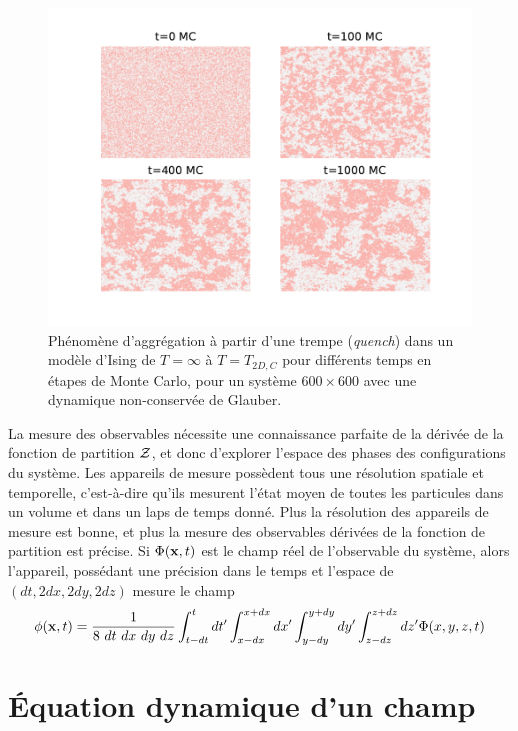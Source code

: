 \begin{figure}[t]
    \centering
    \includegraphics[width=0.9\linewidth]{intro/clusterization.pdf}
    \caption{Phénomène d'aggrégation à partir d'une trempe (\textit{quench}) dans un modèle d'Ising de $T=\infty$ à $T=T_{2D,C}$ \cite{onsager_crystal_1944} pour différents temps en étapes de Monte Carlo, pour un système $600 \times 600$ avec une dynamique non-conservée de Glauber.}
    \label{clusterization}
\end{figure}

La mesure des observables nécessite une connaissance parfaite de la dérivée de la fonction de partition $\mathcal{Z}$, et donc d'explorer l'espace des phases des configurations du système. Les appareils de mesure possèdent tous une résolution spatiale et temporelle, c'est-à-dire qu'ils mesurent l'état moyen de toutes les particules dans un volume et dans un laps de temps donné. Plus la résolution des appareils de mesure est bonne, et plus la mesure des observables dérivées de la fonction de partition est précise. Si $\Phi({\bf x},t)$ est le champ réel de l'observable du système, alors l'appareil, possédant une précision dans le temps et l'espace de $(dt,2dx,2dy,2dz)$ mesure le champ
\begin{align}
    \phi({\bf x},t) = \frac{1}{8~ dt~ dx~ dy~ dz} \int_{t-dt}^{t} dt' \int_{x-dx}^{x+dx} dx' \int_{y-dy}^{y+dy} dy' \int_{z-dz}^{z+dz} dz' \Phi(x,y,z,t)
\end{align}


\section{Équation dynamique d'un champ}

